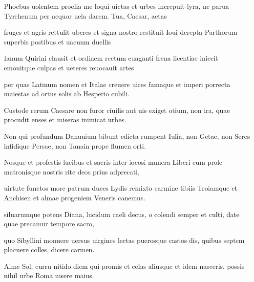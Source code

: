 \documentclass{book}
\newenvironment {carmen} [1] [\relax] 
  {\Titulus \Versus \incipit*\numerus{1}#1}
  {\endVersus}
\newcommand {\Sapphic}   {\Forma \strophae {0 \poena 00 \poena 1}}
\newcommand {\Alcaic}    {\Forma \strophae {0 \poena 01 \poena 2}}
\begin{document}
\begin{carmen}[\Alcaic]


Phoebus uolentem proelia me loqui
 uictas et urbes increpuit lyra,
      ne parua Tyrrhenum per aequor
      uela darem. Tua, Caesar, aetas
 
fruges et agris rettulit uberes               
 et signa nostro restituit Ioui
      derepta Parthorum superbis
      postibus et uacuum duellis
 
Ianum Quirini clausit et ordinem
 rectum euaganti frena licentiae               
      iniecit emouitque culpas
      et ueteres reuocauit artes
 
per quas Latinum nomen et Italae
 creuere uires famaque et imperi
      porrecta maiestas ad ortus               
      solis ab Hesperio cubili.
 
Custode rerum Caesare non furor
 ciuilis aut uis exiget otium,
      non ira, quae procudit enses
      et miseras inimicat urbes.               
 
Non qui profundum Danuuium bibunt
 edicta rumpent Iulia, non Getae,
      non Seres infidique Persae,
      non Tanain prope flumen orti.
 
Nosque et profestis lucibus et sacris               
 inter iocosi munera Liberi
      cum prole matronisque nostris
      rite deos prius adprecati,
 
uirtute functos more patrum duces
 Lydis remixto carmine tibiis               
      Troiamque et Anchisen et almae
      progeniem Veneris canemus.
 

\end{carmen}

\desinitLiber

\cleardoublepage
\pagestyle {CarmenSaecularePage} 
\thispagestyle{empty}


\versus {} \Sapphic

 siluarumque potens Diana,
 lucidum caeli decus, o colendi
 semper et culti, date quae precamur
      tempore sacro,
 
quo Sibyllini monuere uersus               
 uirgines lectas puerosque castos
 dis, quibus septem placuere colles,
      dicere carmen.
 
Alme Sol, curru nitido diem qui
 promis et celas aliusque et idem               
 nasceris, possis nihil urbe Roma
      uisere maius.
 
\end{document}
